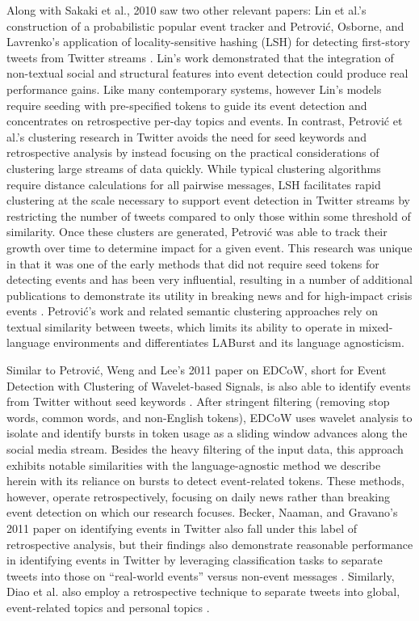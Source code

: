 \documentclass[letterpaper]{article}
\begin{document}
Along with Sakaki et al., 2010 saw two other relevant papers: Lin et al.'s construction of a probabilistic popular event tracker \cite{Lin:2010:PSM:1835804.1835922} and Petrovi\'{c}, Osborne, and Lavrenko's application of locality-sensitive hashing (LSH) for detecting first-story tweets from Twitter streams \cite{Petrovic:2010:SFS:1857999.1858020}.
Lin's work demonstrated that the integration of non-textual social and structural features into event detection could produce real performance gains.
Like many contemporary systems, however Lin's models require seeding with pre-specified tokens to guide its event detection and concentrates on retrospective per-day topics and events.
In contrast, Petrovi\'{c} et al.'s clustering research in Twitter avoids the need for seed keywords and retrospective analysis by instead focusing on the practical considerations of clustering large streams of data quickly.
While typical clustering algorithms require distance calculations for all pairwise messages, LSH facilitates rapid clustering at the scale necessary to support event detection in Twitter streams by restricting the number of tweets compared to only those within some threshold of similarity.
Once these clusters are generated, Petrovi\'{c} was able to track their growth over time to determine impact for a given event.
This research was unique in that it was one of the early methods that did not require seed tokens for detecting events and has been very influential, resulting in a number of additional publications to demonstrate its utility in breaking news and for high-impact crisis events \cite{osborne2014real,petrovic2013can,6601695}.
Petrovi\'{c}'s work and related semantic clustering approaches rely on textual similarity between tweets, which limits its ability to operate in mixed-language environments and differentiates LABurst and its language agnosticism.

Similar to Petrovi\'{c}, Weng and Lee's 2011 paper on EDCoW, short for Event Detection with Clustering of Wavelet-based Signals, is also able to identify events from Twitter without seed keywords \cite{weng2011event}.
After stringent filtering (removing stop words, common words, and non-English tokens), EDCoW uses wavelet analysis to isolate and identify bursts in token usage as a sliding window advances along the social media stream.
Besides the heavy filtering of the input data, this approach exhibits notable similarities with the language-agnostic method we describe herein with its reliance on bursts to detect event-related tokens.
These methods, however, operate retrospectively, focusing on daily news rather than breaking event detection on which our research focuses.
Becker, Naaman, and Gravano's 2011 paper on identifying events in Twitter also fall under this label of retrospective analysis, but their findings also demonstrate reasonable performance in identifying events in Twitter by leveraging classification tasks to separate tweets into those on ``real-world events'' versus non-event messages \cite{becker2011beyond-tr,becker2011beyond}.
Similarly, Diao et al. also employ a retrospective technique to separate tweets into global, event-related topics and personal topics \cite{diao2012finding}.
\end{document}
